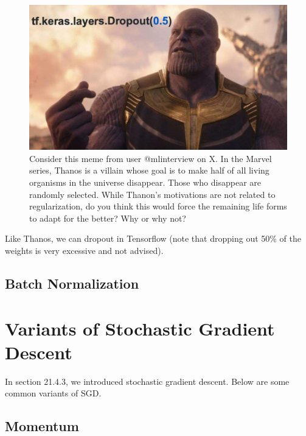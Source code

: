 \documentclass{article}
\begin{document}
\begin{figure}[h]
    \centering
    \includegraphics[scale = 0.24]{dl-figures/thanos-dropout-meme.jpg}
    \caption{Consider this meme from user @mlinterview on X. In the Marvel series, Thanos is a villain whose goal is to make half of all living organisms in the universe disappear. Those who disappear are randomly selected. While Thanon's motivations are not related to regularization, do you think this would force the remaining life forms to adapt for the better? Why or why not?}
    \label{figure:thanos-dropout-meme}
\end{figure}

Like Thanos, we can dropout in Tensorflow (note that dropping out 50\% of the weights is very excessive and not advised)\cite{tensorflow2015-whitepaper}.

\FloatBarrier

\subsection{Batch Normalization}



\section{Variants of Stochastic Gradient Descent} %

In section 21.4.3, we introduced stochastic gradient descent. Below are some common variants of SGD.

\subsection{Momentum} %
\end{document}
